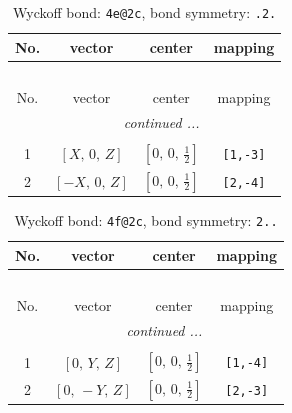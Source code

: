 \documentclass[fleqn,8pt]{jsarticle}
\begin{document}
\renewcommand{\arraystretch}{1.2}
\begin{longtable}{cccc}
\caption{Wyckoff bond: {\tt 4e@2c}, bond symmetry: {\tt .2.}}
 \\
 \hline \hline
No. & vector & center & mapping \\ \hline \endfirsthead

\multicolumn{3}{l}{\tablename\ \thetable{}} \\
 \hline \hline
No. & vector & center & mapping \\ \hline \endhead

 \hline \hline
\multicolumn{3}{r}{\footnotesize\it continued ...} \\ \endfoot

 \hline \hline
\multicolumn{3}{r}{} \\ \endlastfoot

1 & $\left[ X,\, 0,\, Z \right]$ & $\left[ 0,\, 0,\, \frac{1}{2} \right]$ & {\tt [1,-3]} \\ \hline
2 & $\left[ - X,\, 0,\, Z \right]$ & $\left[ 0,\, 0,\, \frac{1}{2} \right]$ & {\tt [2,-4]} \\
\end{longtable}
\renewcommand{\arraystretch}{1.2}
\begin{longtable}{cccc}
\caption{Wyckoff bond: {\tt 4f@2c}, bond symmetry: {\tt 2..}}
 \\
 \hline \hline
No. & vector & center & mapping \\ \hline \endfirsthead

\multicolumn{3}{l}{\tablename\ \thetable{}} \\
 \hline \hline
No. & vector & center & mapping \\ \hline \endhead

 \hline \hline
\multicolumn{3}{r}{\footnotesize\it continued ...} \\ \endfoot

 \hline \hline
\multicolumn{3}{r}{} \\ \endlastfoot

1 & $\left[ 0,\, Y,\, Z \right]$ & $\left[ 0,\, 0,\, \frac{1}{2} \right]$ & {\tt [1,-4]} \\ \hline
2 & $\left[ 0,\, - Y,\, Z \right]$ & $\left[ 0,\, 0,\, \frac{1}{2} \right]$ & {\tt [2,-3]} \\
\end{longtable}
\renewcommand{\arraystretch}{1.2}
\end{document}
